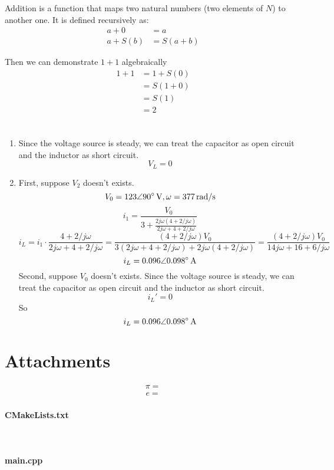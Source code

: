 \documentclass{article}
\begin{document}
Addition is a function that maps two natural numbers (two elements of $N$) to another one. It is defined recursively as:
\begin{align*}
a+0&=a\\
a+S(b)&=S(a+b)
\end{align*}

Then we can demonstrate $1+1$ algebraically
\begin{align*}
1+1&=1+S(0)\\
&=S(1+0)\\
&=S(1)\\
&=2
\end{align*}

\section{}
\begin{enumerate}
\item
Since the voltage source is steady, we can treat the capacitor as open circuit and the inductor as short circuit.
$$V_L=0$$
\item
First, suppose $V_2$ doesn't exists.
$$V_0=123\angle90^\circ{\rm\,V},\omega=377{\rm\,rad/s}$$
$$i_1=\frac{V_0}{3+\frac{2j\omega(4+2/j\omega)}{2j\omega+4+2/j\omega}}$$
$$i_L=i_1\cdot\frac{4+2/j\omega}{2j\omega+4+2/j\omega}=\frac{(4+2/j\omega)V_0}{3(2j\omega+4+2/j\omega)+2j\omega(4+2/j\omega)}=\frac{(4+2/j\omega)V_0}{14j\omega+16+6/j\omega}$$
$$i_L=0.096\angle0.098^\circ{\rm\,A}$$
Second, suppose $V_0$ doesn't exists. Since the voltage source is steady, we can treat the capacitor as open circuit and the inductor as short circuit.
$$i_L'=0$$
So $$i_L=0.096\angle0.098^\circ{\rm\,A}$$
\end{enumerate}

\newpage
\section*{Attachments}

\begin{align*}
\pi=
\end{align*}
\begin{align*}
e=
\end{align*}

\paragraph{CMakeLists.txt}\ 


\paragraph{main.cpp}\ 
\lstset{language=C++}

\end{document}
